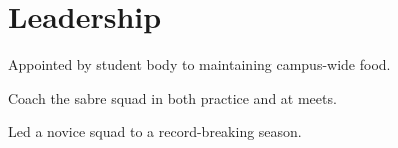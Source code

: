 \documentclass[letterpaper]{deedy-resume} %
\begin{document}
\begin{minipage}[t]{0.39\textwidth}

\section{Leadership}


\indent 

\begin{tightitemize}
	\item Appointed by student body to maintaining campus-wide food.
\end{tightitemize}

\sectionspace 



\begin{tightitemize}
	\item Coach the sabre squad in both practice and at meets.
	\item Led a novice squad to a record-breaking season.
\end{tightitemize}

\sectionspace






\end{minipage} %
\hfill
%
%
\end{document}
